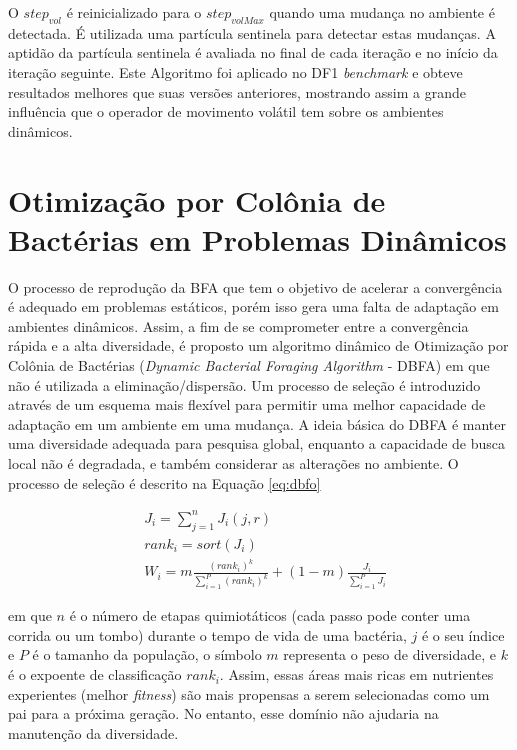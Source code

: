 \noindent O $step_{vol}$ é reinicializado para o $step_{volMax}$ quando uma mudança no ambiente é detectada. É utilizada uma partícula sentinela para detectar estas mudanças. A aptidão da partícula sentinela é avaliada no final de cada iteração e no início da iteração seguinte. Este Algoritmo foi aplicado no DF1 \textit{benchmark} e obteve resultados melhores que suas versões anteriores, mostrando assim a grande influência que o operador de movimento volátil tem sobre os ambientes dinâmicos.

\section{Otimização por Colônia de Bactérias em Problemas Dinâmicos}
\label{sec:bfo_behaviour}

O processo de reprodução da BFA que tem o objetivo de acelerar a convergência é adequado em problemas estáticos, porém isso gera uma falta de adaptação em ambientes dinâmicos. Assim, a fim de se comprometer entre a convergência rápida e a alta diversidade, é proposto um algoritmo dinâmico de Otimização por Colônia de Bactérias (\textit{Dynamic Bacterial Foraging Algorithm} - DBFA) \cite{passino2002biomimicry} em que não é utilizada a eliminação/dispersão. Um processo de seleção é introduzido através de um esquema mais flexível para permitir uma melhor capacidade de adaptação em um ambiente em uma mudança. A ideia básica do DBFA é manter uma diversidade adequada para pesquisa global, enquanto a capacidade de busca local não é degradada, e também considerar as alterações no ambiente. O processo de seleção é descrito na Equação \ref{eq:dbfo}

\begin{equation}
\label{eq:dbfo}
\begin{split}
& J_i = \sum_{j=1}^{n} J_i(j,r) \\
& rank_i = sort(J_i) \\
& W_i = m \frac{(rank_i)^k}{\sum_{i=1}^{P} (rank_i)^k} + (1 - m) \frac{J_i}{\sum_{i=1}^{P} J_i}
\end{split}
\end{equation}

\noindent em que $n$ é o número de etapas quimiotáticos (cada passo pode conter uma corrida ou um tombo) durante o tempo de vida de uma bactéria, $j$ é o seu índice e $P$ é o tamanho da população, o símbolo $m$ representa o peso de diversidade, e $k$ é o expoente de classificação $rank_i$. Assim, essas áreas mais ricas em nutrientes experientes (melhor \textit{fitness}) são mais propensas a serem selecionadas como um pai para a próxima geração. No entanto, esse domínio não ajudaria na manutenção da diversidade.

